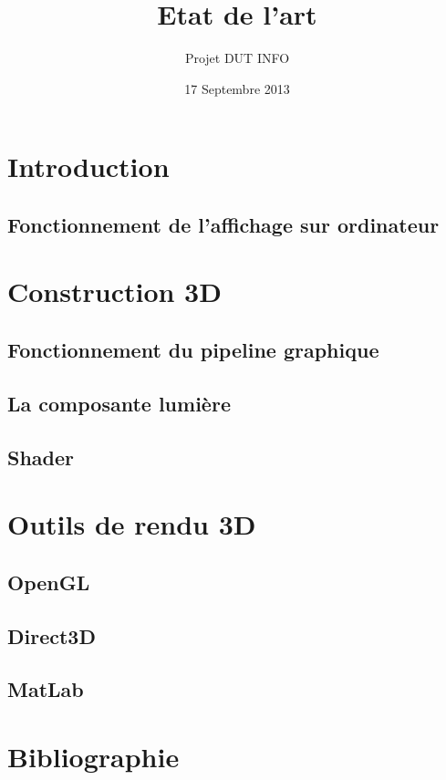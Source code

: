 \documentclass[12pt,a4paper,openany]{report}
\title{Etat de l'art}
\author{Projet DUT INFO}
\date{17 Septembre 2013}
\begin{document}
\maketitle

\hypertarget{tableofcontents}{} %
\tableofcontents

\part{Introduction}

\chapter{Fonctionnement de l'affichage sur ordinateur}


\part{Construction 3D}
\chapter{Fonctionnement du pipeline graphique}


\chapter{La composante lumière}


\chapter{Shader}


\part{Outils de rendu 3D}

\chapter{OpenGL}


\chapter{Direct3D}

\chapter{MatLab}



\part{Bibliographie}

\end{document}
